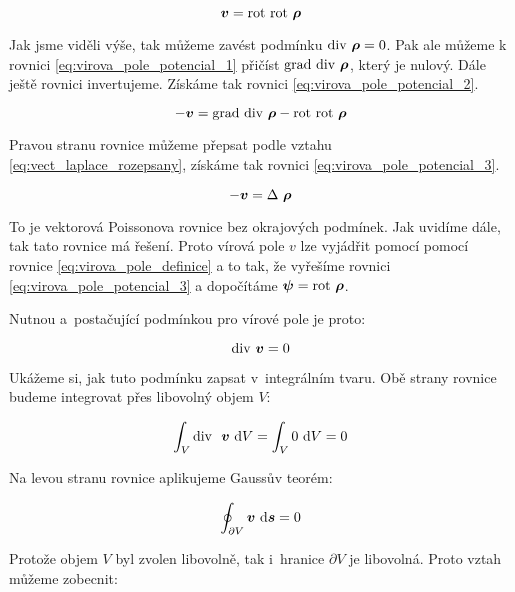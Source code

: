 \begin{equation}
\label{eq:virova_pole_potencial_1}
\boldsymbol{v} = \mathrm{rot} \ \mathrm{rot} \ \boldsymbol{\rho}
\end{equation}

Jak jsme viděli výše, tak můžeme zavést podmínku \(\mathrm{div} \ \boldsymbol{\rho} = 0\). Pak ale můžeme k rovnici \eqref{eq:virova_pole_potencial_1}
přičíst \(\grad \ \diverg \ \vect{\rho}\), který je nulový. Dále ještě rovnici invertujeme. Získáme tak rovnici \eqref{eq:virova_pole_potencial_2}.

\begin{equation}
\label{eq:virova_pole_potencial_2}
-\vect{v} = \grad \ \diverg \ \vect{\rho} - \rot \ \rot \ \vect{\rho}
\end{equation}

Pravou stranu rovnice můžeme přepsat podle vztahu \eqref{eq:vect_laplace_rozepsany}, získáme tak rovnici \eqref{eq:virova_pole_potencial_3}.

\begin{equation}
\label{eq:virova_pole_potencial_3}
-\boldsymbol{v} = \Delta \ \boldsymbol{\rho}
\end{equation}

To je vektorová Poissonova rovnice bez okrajových podmínek. Jak uvidíme dále, tak tato rovnice má řešení. Proto vírová pole \(v\) lze vyjádřit
pomocí pomocí rovnice \eqref{eq:virova_pole_definice} a to tak, že vyřešíme rovnici \eqref{eq:virova_pole_potencial_3} a dopočítáme \(\vect{\psi} = \rot \ \vect{\rho}\).

Nutnou a~postačující podmínkou pro vírové pole je proto:

\begin{equation}
\mathrm{div} \ \boldsymbol{v} = 0
\end{equation}

Ukážeme si, jak tuto podmínku zapsat v~integrálním tvaru. Obě strany rovnice budeme integrovat přes libovolný objem \(V\):

\begin{equation}
\int_{V} \diverg \ \ \vect{v} \ \mathrm{d}V = \int_{V} 0 \ \mathrm{d}V = 0
\end{equation}

Na levou stranu rovnice aplikujeme Gaussův teorém:

\begin{equation}
\oint_{\partial V} \vect{v} \ \mathrm{d}\vect{s} = 0
\end{equation}

Protože objem \(V\) byl zvolen libovolně, tak i~hranice \(\partial V\) je libovolná. Proto vztah můžeme zobecnit:

